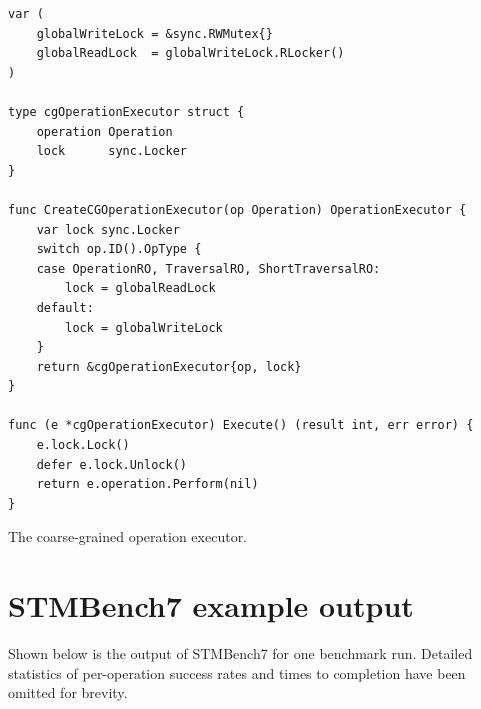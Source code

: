 \documentclass[12pt,a4paper,oneside,openright]{report}
\newcommand{\mycaption}[2]{\caption[#1]{#1 #2}}
\begin{document}
\begin{Listing}[hbtp]
\begin{lstlisting}
var (
	globalWriteLock = &sync.RWMutex{}
	globalReadLock  = globalWriteLock.RLocker()
)

type cgOperationExecutor struct {
	operation Operation
	lock      sync.Locker
}

func CreateCGOperationExecutor(op Operation) OperationExecutor {
	var lock sync.Locker
	switch op.ID().OpType {
	case OperationRO, TraversalRO, ShortTraversalRO:
		lock = globalReadLock
	default:
		lock = globalWriteLock
	}
	return &cgOperationExecutor{op, lock}
}

func (e *cgOperationExecutor) Execute() (result int, err error) {
	e.lock.Lock()
	defer e.lock.Unlock()
	return e.operation.Perform(nil)
}
\end{lstlisting}

  \mycaption{The coarse-grained operation executor.}{}
  \label{lst:cgOpExec}
\end{Listing}


\chapter{STMBench7 example output}
\label{cha:stmb-example-outp}

Shown below is the output of STMBench7 for one benchmark run. Detailed
statistics of per-operation success rates and times to completion have
been omitted for brevity.

\bigskip
\end{document}
